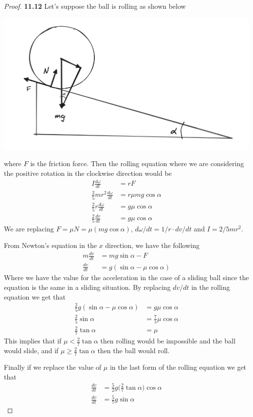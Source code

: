 \documentclass[11pt]{article}
\theoremstyle{definition}
\begin{document}
\cleardoublepage
\begin{proof}{\textbf{11.12}}
    Let's suppose the ball is rolling as shown below
    \begin{center}
        \includegraphics[scale=0.45]{ch11-12.png}
    \end{center}
    where $F$ is the friction force. Then the rolling equation where we are
    considering the positive rotation in the clockwise direction
    would be
    \begin{align*}
        I \frac{d\omega}{dt} &= rF\\
        \frac{2}{5}mr^2\frac{d\omega}{dt} &= r\mu mg\cos\alpha\\
        \frac{2}{5}r\frac{d\omega}{dt} &= g\mu \cos\alpha\\
        \frac{2}{5}\frac{dv}{dt} &= g\mu \cos\alpha
    \end{align*}
    We are replacing $F = \mu N = \mu (mg \cos\alpha)$,
    $d\omega/dt = 1/r\cdot dv/dt$ and $I = 2/5 mr^2$.

    From Newton's equation in the $x$ direction, we have the following
    \begin{align*}
        m \frac{dv}{dt} &= mg \sin\alpha - F\\
        \frac{dv}{dt} &= g(\sin\alpha - \mu \cos\alpha)
    \end{align*}
    Where we have the value for the acceleration in the case of a sliding ball
    since the equation is the same in a sliding situation.
    By replacing $dv/dt$ in the rolling equation we get that
    \begin{align*}
        \frac{2}{5}g(\sin\alpha - \mu \cos\alpha) &= g\mu \cos\alpha\\
        \frac{2}{5}\sin\alpha &= \frac{7}{5}\mu \cos\alpha\\   
        \frac{2}{7}\tan\alpha &= \mu   
    \end{align*}
    This implies that if $\mu < \frac{2}{7}\tan\alpha$ then rolling would be
    impossible and the ball would slide, and if $\mu \geq \frac{2}{7}\tan\alpha$
    then the ball would roll.

    Finally if we replace the value of $\mu$ in the last form of the rolling
    equation we get that
    \begin{align*}        
        \frac{dv}{dt} &= \frac{5}{2}g\bigg(\frac{2}{7}\tan\alpha\bigg)\cos\alpha\\
        \frac{dv}{dt} &= \frac{5}{7}g\sin\alpha
    \end{align*}
\end{proof}
\end{document}

